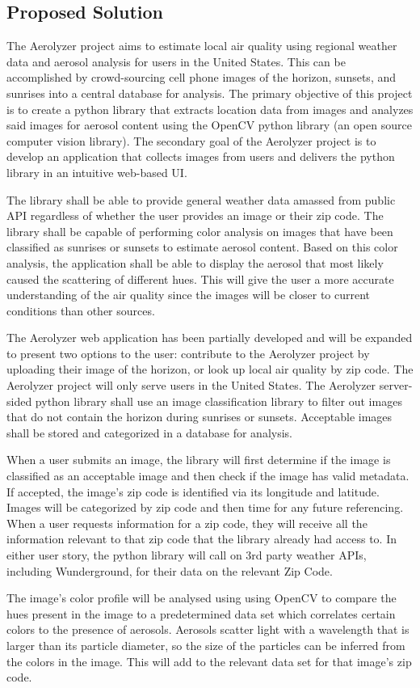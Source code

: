 \documentclass[letterpaper,10pt,draftclsnofoot,onecolumn]{IEEEtran}
\newcommand\tab[1][1cm]{\hspace*{#1}}
\begin{document}
\begin{flushleft}
\section{Proposed Solution}
\tab The Aerolyzer project aims to estimate local air quality using regional weather data and aerosol analysis for users in the United States. This can be accomplished by crowd-sourcing cell phone images of the horizon, sunsets, and sunrises into a central database for analysis. The primary objective of this project is to create a python library that extracts location data from images and analyzes said images for aerosol content using the OpenCV python library (an open source computer vision library). The secondary goal of the Aerolyzer project is to develop an application that collects images from users and delivers the python library in an intuitive web-based UI. 
\par
\tab The library shall be able to provide general weather data amassed from public API regardless of whether the user provides an image or their zip code. The library  shall be capable of performing color analysis on images that have been classified as sunrises or sunsets to estimate aerosol content. Based on this color analysis, the application shall be able to display the aerosol that most likely caused the scattering of different hues. This will give the user a more accurate understanding of the air quality since the images will be closer to current conditions than other sources.
\par
\tab The Aerolyzer web application has been partially developed and will be expanded to present two options to the user: contribute to the Aerolyzer project by uploading their image of the horizon, or look up local air quality by zip code. The Aerolyzer project will only serve users in the United States. The Aerolyzer server-sided python library shall use an image classification library to filter out images that do not contain the horizon during sunrises or sunsets. Acceptable images shall be stored and categorized in a database for analysis. 
\par
\tab When a user submits an image, the library will first determine if the image is classified as an acceptable image and then check if the image has valid metadata. If accepted, the image's zip code is identified via its longitude and latitude. Images will be categorized by zip code and then time for any future referencing. When a user requests information for a zip code, they will receive all the information relevant to that zip code that the library already had access to. In either user story, the python library will call on 3rd party weather APIs, including Wunderground, for their data on the relevant Zip Code.
\par
\tab The image's color profile will be analysed using using OpenCV to compare the hues present in the image to a predetermined data set which correlates certain colors to the presence of aerosols. Aerosols scatter light with a wavelength that is larger than its particle diameter, so the size of the particles can be inferred from the colors in the image. This will add to the relevant data set for that image's zip code. 


\end{flushleft}
\end{document}
